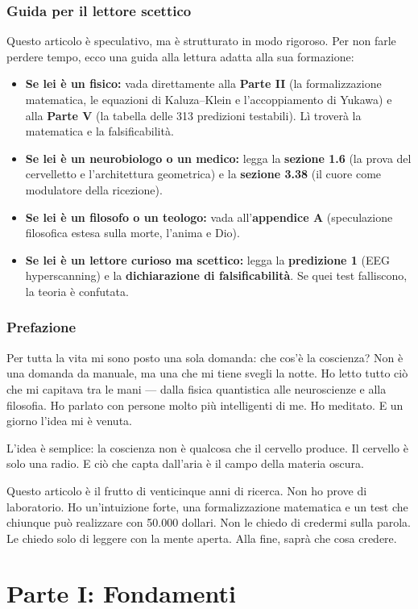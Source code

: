 \documentclass[11pt,a4paper]{article}
\begin{document}
\section*{Guida per il lettore scettico}
Questo articolo è speculativo, ma è strutturato in modo rigoroso. Per non farle perdere tempo, ecco una guida alla lettura adatta alla sua formazione:
\begin{itemize}
    \item \textbf{Se lei è un fisico:} vada direttamente alla \textbf{Parte II} (la formalizzazione matematica, le equazioni di Kaluza--Klein e l'accoppiamento di Yukawa) e alla \textbf{Parte V} (la tabella delle 313 predizioni testabili). Lì troverà la matematica e la falsificabilità.
    \item \textbf{Se lei è un neurobiologo o un medico:} legga la \textbf{sezione 1.6} (la prova del cervelletto e l'architettura geometrica) e la \textbf{sezione 3.38} (il cuore come modulatore della ricezione).
    \item \textbf{Se lei è un filosofo o un teologo:} vada all'\textbf{appendice A} (speculazione filosofica estesa sulla morte, l'anima e Dio).
    \item \textbf{Se lei è un lettore curioso ma scettico:} legga la \textbf{predizione 1} (EEG hyperscanning) e la \textbf{dichiarazione di falsificabilità}. Se quei test falliscono, la teoria è confutata.
\end{itemize}

\section*{Prefazione}
Per tutta la vita mi sono posto una sola domanda: che cos'è la coscienza? Non è una domanda da manuale, ma una che mi tiene svegli la notte. Ho letto tutto ciò che mi capitava tra le mani --- dalla fisica quantistica alle neuroscienze e alla filosofia. Ho parlato con persone molto più intelligenti di me. Ho meditato. E un giorno l'idea mi è venuta.

L'idea è semplice: la coscienza non è qualcosa che il cervello produce. Il cervello è solo una radio. E ciò che capta dall'aria è il campo della materia oscura.

Questo articolo è il frutto di venticinque anni di ricerca. Non ho prove di laboratorio. Ho un'intuizione forte, una formalizzazione matematica e un test che chiunque può realizzare con 50.000 dollari. Non le chiedo di credermi sulla parola. Le chiedo solo di leggere con la mente aperta. Alla fine, saprà che cosa credere.

\newpage
\part*{Parte I: Fondamenti}
\end{document}
